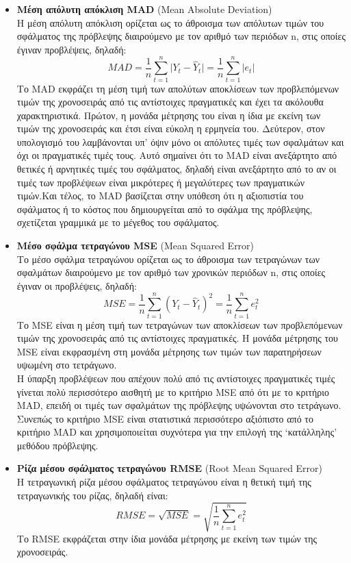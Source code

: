 \begin{itemize}
\item \textbf{Μέση απόλυτη απόκλιση MAD} (Mean Absolute Deviation)\\
Η μέση απόλυτη απόκλιση ορίζεται ως το άθροισμα των απόλυτων τιμών του
σφάλματος της πρόβλεψης διαιρούμενο με τον αριθμό των περιόδων n, στις οποίες
έγιναν προβλέψεις, δηλαδή:\\
$$ MAD= \frac{1}{n} \sum_{t=1}^n \vert Y_t-\widehat{Y}_t \vert =\frac{1}{n} \sum_{t=1}^n \vert e_t \vert $$
Το MAD εκφράζει τη μέση τιμή των απολύτων αποκλίσεων των προβλεπόμενων
τιμών της χρονοσειράς από τις αντίστοιχες πραγματικές και έχει τα ακόλουθα
χαρακτηριστικά. Πρώτον, η μονάδα μέτρησης του είναι η ίδια με εκείνη των τιμών
της χρονοσειράς και έτσι είναι εύκολη η ερμηνεία του. Δεύτερον, στον υπολογισμό
του λαμβάνονται υπ’ όψιν μόνο οι απόλυτες τιμές των σφαλμάτων και όχι οι
πραγματικές τιμές τους. Αυτό σημαίνει ότι το MAD είναι ανεξάρτητο από θετικές ή αρνητικές τιμές του σφάλματος, δηλαδή είναι ανεξάρτητο από το αν οι τιμές των
προβλέψεων είναι μικρότερες ή μεγαλύτερες των
πραγματικών τιμών.Και τέλος, το MAD βασίζεται στην υπόθεση ότι η αξιοπιστία του
σφάλματος ή το κόστος που δημιουργείται από το σφάλμα της πρόβλεψης, σχετίζεται
γραμμικά με το μέγεθος του σφάλματος.

\item \textbf{ Μέσο σφάλμα τετραγώνου MSE} (Mean Squared Error)\\
Το μέσο σφάλμα τετραγώνου ορίζεται ως το άθροισμα των τετραγώνων των
σφαλμάτων διαιρούμενο με τον αριθμό των χρονικών περιόδων n, στις οποίες έγιναν οι
προβλέψεις, δηλαδή:\\
$$ MSE= \frac{1}{n} \sum_{t=1}^n \left( Y_t-\widehat{Y}_t \right)^2 =\frac{1}{n} \sum_{t=1}^n  e_t^2 $$
Το MSE είναι η μέση τιμή των τετραγώνων των αποκλίσεων των προβλεπόμενων
τιμών της χρονοσειράς από τις αντίστοιχες πραγματικές. Η μονάδα μέτρησης του
MSE είναι εκφρασμένη στη μονάδα μέτρησης των τιμών των παρατηρήσεων
υψωμένη στο τετράγωνο.\\
Η ύπαρξη προβλέψεων που απέχουν πολύ από τις αντίστοιχες πραγματικές τιμές
γίνεται πολύ περισσότερο αισθητή με το κριτήριο MSE από ότι με το κριτήριο MAD,
επειδή οι τιμές των σφαλμάτων της πρόβλεψης υψώνονται στο τετράγωνο. Συνεπώς
το κριτήριο MSE είναι στατιστικά περισσότερο αξιόπιστο από το κριτήριο MAD και
χρησιμοποιείται συχνότερα για την επιλογή της ‘κατάλληλης’ μεθόδου πρόβλεψης.

\item \textbf{Ρίζα μέσου
σφάλματος τετραγώνου RMSE} (Root Mean Squared Error)\\
H τετραγωνική ρίζα μέσου
σφάλματος τετραγώνου είναι η
θετική τιμή της τετραγωνικής του ρίζας, δηλαδή είναι:\\
$$ RMSE=\sqrt{MSE}=\sqrt{\frac{1}{n}\sum_{t=1}^n e_t^2} $$
Το RMSE εκφράζεται στην ίδια μονάδα μέτρησης με εκείνη των τιμών της
χρονοσειράς.\\



\end{itemize}
